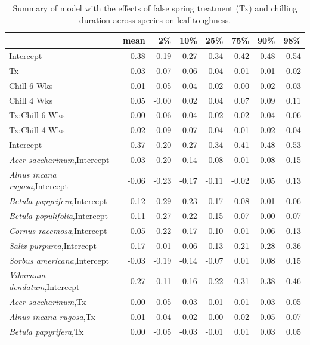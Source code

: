 \documentclass{article}\usepackage[]{graphicx}\usepackage[]{color}
\begin{document}
\newpage
\begin{longtable}{lrrrrrrr}
\caption{Summary of model with the effects of false spring treatment (Tx) and chilling duration across species on leaf toughness.} \\ 
  \hline
 & mean & 2\% & 10\% & 25\% & 75\% & 90\% & 98\% \\ 
  \hline \endhead  \hline
Intercept & 0.38 & 0.19 & 0.27 & 0.34 & 0.42 & 0.48 & 0.54 \\ 
  Tx & -0.03 & -0.07 & -0.06 & -0.04 & -0.01 & 0.01 & 0.02 \\ 
  Chill 6 Wks & -0.01 & -0.05 & -0.04 & -0.02 & 0.00 & 0.02 & 0.03 \\ 
  Chill 4 Wks & 0.05 & -0.00 & 0.02 & 0.04 & 0.07 & 0.09 & 0.11 \\ 
  Tx:Chill 6 Wks & -0.00 & -0.06 & -0.04 & -0.02 & 0.02 & 0.04 & 0.06 \\ 
  Tx:Chill 4 Wks & -0.02 & -0.09 & -0.07 & -0.04 & -0.01 & 0.02 & 0.04 \\ 
  Intercept & 0.37 & 0.20 & 0.27 & 0.34 & 0.41 & 0.48 & 0.53 \\ 
  \textit{Acer saccharinum},Intercept & -0.03 & -0.20 & -0.14 & -0.08 & 0.01 & 0.08 & 0.15 \\ 
  \textit{Alnus incana rugosa},Intercept & -0.06 & -0.23 & -0.17 & -0.11 & -0.02 & 0.05 & 0.13 \\ 
  \textit{Betula papyrifera},Intercept & -0.12 & -0.29 & -0.23 & -0.17 & -0.08 & -0.01 & 0.06 \\ 
  \textit{Betula populifolia},Intercept & -0.11 & -0.27 & -0.22 & -0.15 & -0.07 & 0.00 & 0.07 \\ 
  \textit{Cornus racemosa},Intercept & -0.05 & -0.22 & -0.17 & -0.10 & -0.01 & 0.06 & 0.13 \\ 
  \textit{Salix purpurea},Intercept & 0.17 & 0.01 & 0.06 & 0.13 & 0.21 & 0.28 & 0.36 \\ 
  \textit{Sorbus americana},Intercept & -0.03 & -0.19 & -0.14 & -0.07 & 0.01 & 0.08 & 0.15 \\ 
  \textit{Viburnum dendatum},Intercept & 0.27 & 0.11 & 0.16 & 0.22 & 0.31 & 0.38 & 0.46 \\ 
  \textit{Acer saccharinum},Tx & 0.00 & -0.05 & -0.03 & -0.01 & 0.01 & 0.03 & 0.05 \\ 
  \textit{Alnus incana rugosa},Tx & 0.01 & -0.04 & -0.02 & -0.00 & 0.02 & 0.05 & 0.07 \\ 
  \textit{Betula papyrifera},Tx & 0.00 & -0.05 & -0.03 & -0.01 & 0.01 & 0.03 & 0.05 \\ 

\end{longtable}
\end{document}
